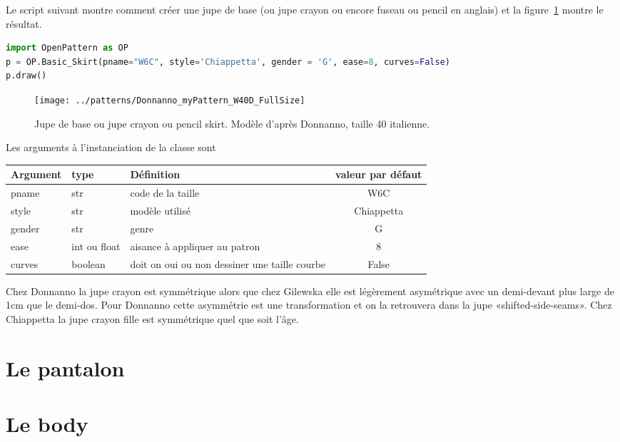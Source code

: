 \documentclass[10pt,a4paper,twoside]{report}
\begin{document}
Le script suivant montre comment créer une jupe de base (ou jupe crayon ou encore fuseau ou pencil en anglais) et la figure~\ref{fig:pencil} montre le résultat.

\begin{lstlisting}[language=python]
import OpenPattern as OP
p = OP.Basic_Skirt(pname="W6C", style='Chiappetta', gender = 'G', ease=8, curves=False)
p.draw()
\end{lstlisting}

\begin{figure}[h]
\begin{center}
\texttt{[image: ../patterns/Donnanno\_myPattern\_W40D\_FullSize]}
\end{center}
\label{fig:pencil}
\caption{Jupe de base ou jupe crayon ou pencil skirt. Modèle d'après Donnanno, taille 40 italienne.}
\end{figure}



Les arguments à l'instanciation de la classe sont

\begin{tabular}{lllc}\\
Argument & type &  Définition & valeur par défaut\\ \hline
pname & str & code de la taille& W6C\\
style & str & modèle utilisé& Chiappetta\\
gender & str & genre & G\\
ease & int ou float & aisance à appliquer au patron& 8\\
curves & boolean & doit on oui ou non dessiner une taille courbe& False\\
\end{tabular}

Chez Donnanno la jupe crayon est symmétrique alors que chez Gilewska elle est légèrement asymétrique avec un demi-devant plus large de 1cm que le demi-dos. Pour Donnanno cette asymmétrie est une transformation et on la retrouvera dans la jupe «shifted-side-seams». Chez Chiappetta la jupe crayon fille est symmétrique quel que soit l'âge.

\section{Le pantalon}

\section{Le body}
\end{document}
